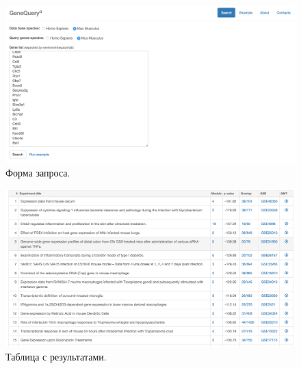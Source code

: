 \documentclass[10pt,pdf,utf8,russian,aspectratio=169]{beamer}
\begin{document}
\begin{frame}
    \begin{figure}[p]
        \centering
        \caption{Форма запроса.}
        \includegraphics[height=0.9\textheight]{./img/screen_query.png}
    \end{figure}
\end{frame}

\begin{frame}
    \begin{figure}[p]
        \centering
        \caption{Таблица с результатами.}
        \includegraphics[height=0.9\textheight]{./img/screen_results.png}
    \end{figure}
\end{frame}
\end{document}
